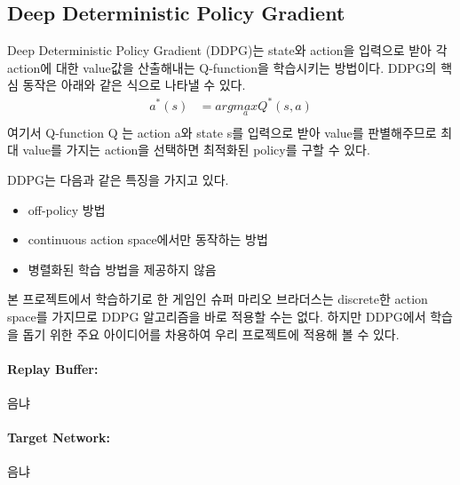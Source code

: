 \subsection{Deep Deterministic Policy Gradient}
Deep Deterministic Policy Gradient (DDPG)는 state와 action을 입력으로 받아 각 action에 대한 value값을 산출해내는 Q-function을 학습시키는 방법이다.
DDPG의 핵심 동작은 아래와 같은 식으로 나타낼 수 있다.
\begin{align*}
	a^*(s) &= arg \underset{a}{max} Q^*(s,a) \\
\end{align*}
여기서 Q-function Q 는 action a와 state s를 입력으로 받아 value를 판별해주므로 최대 value를 가지는 action을 선택하면 최적화된 policy를 구할 수 있다.

DDPG는 다음과 같은 특징을 가지고 있다.
\begin{itemize}
	\item off-policy 방법
	\item continuous action space에서만 동작하는 방법
	\item 병렬화된 학습 방법을 제공하지 않음
\end{itemize}
본 프로젝트에서 학습하기로 한 게임인 슈퍼 마리오 브라더스는 discrete한 action space를 가지므로 DDPG 알고리즘을 바로 적용할 수는 없다.
하지만 DDPG에서 학습을 돕기 위한 주요 아이디어를 차용하여 우리 프로젝트에 적용해 볼 수 있다.

\paragraph{\textbf{Replay Buffer:}}
음냐
\paragraph{\textbf{Target Network:}}
음냐
